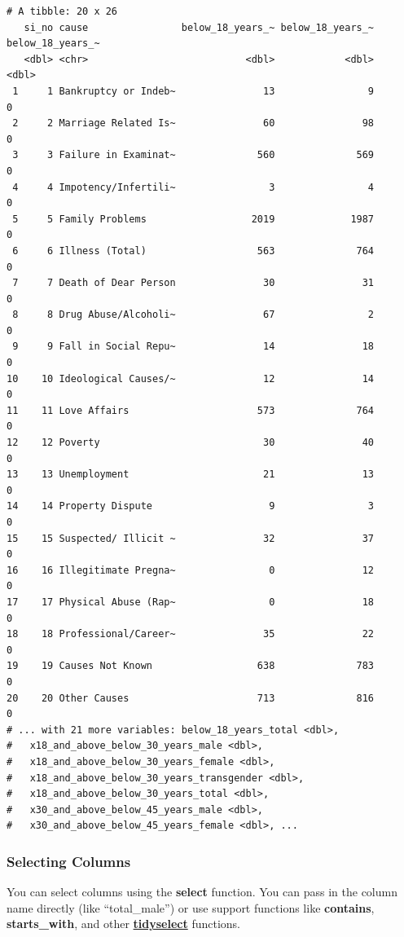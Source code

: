\documentclass[
  letterpaper,
  DIV=11,
  numbers=noendperiod]{scrartcl}
\begin{document}
\begin{verbatim}
# A tibble: 20 x 26
   si_no cause                below_18_years_~ below_18_years_~ below_18_years_~
   <dbl> <chr>                           <dbl>            <dbl>            <dbl>
 1     1 Bankruptcy or Indeb~               13                9                0
 2     2 Marriage Related Is~               60               98                0
 3     3 Failure in Examinat~              560              569                0
 4     4 Impotency/Infertili~                3                4                0
 5     5 Family Problems                  2019             1987                0
 6     6 Illness (Total)                   563              764                0
 7     7 Death of Dear Person               30               31                0
 8     8 Drug Abuse/Alcoholi~               67                2                0
 9     9 Fall in Social Repu~               14               18                0
10    10 Ideological Causes/~               12               14                0
11    11 Love Affairs                      573              764                0
12    12 Poverty                            30               40                0
13    13 Unemployment                       21               13                0
14    14 Property Dispute                    9                3                0
15    15 Suspected/ Illicit ~               32               37                0
16    16 Illegitimate Pregna~                0               12                0
17    17 Physical Abuse (Rap~                0               18                0
18    18 Professional/Career~               35               22                0
19    19 Causes Not Known                  638              783                0
20    20 Other Causes                      713              816                0
# ... with 21 more variables: below_18_years_total <dbl>,
#   x18_and_above_below_30_years_male <dbl>,
#   x18_and_above_below_30_years_female <dbl>,
#   x18_and_above_below_30_years_transgender <dbl>,
#   x18_and_above_below_30_years_total <dbl>,
#   x30_and_above_below_45_years_male <dbl>,
#   x30_and_above_below_45_years_female <dbl>, ...
\end{verbatim}

\hypertarget{selecting-columns}{%
\subsubsection{Selecting Columns}\label{selecting-columns}}

You can select columns using the \textbf{select} function. You can pass
in the column name directly (like ``total\_male'') or use support
functions like \textbf{contains}, \textbf{starts\_with}, and other
\href{https://tidyselect.r-lib.org}{\textbf{tidyselect}} functions.
\end{document}
